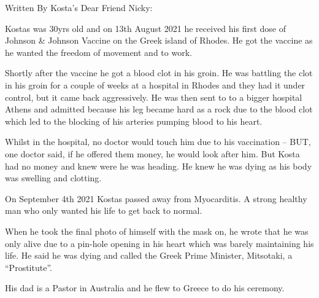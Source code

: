 Written By Kosta’s Dear Friend Nicky:

Kostas was 30yrs old and on 13th August 2021 he received his first dose of
Johnson \& Johnson Vaccine on the Greek island of Rhodes. He got the vaccine as
he wanted the freedom of movement and to work.

Shortly after the vaccine he got a blood clot in his groin. He was battling the
clot in his groin for a couple of weeks at a hospital in Rhodes and they had it
under control, but it came back aggressively. He was then sent to to a bigger
hospital Athens and admitted because his leg became hard as a rock due to the
blood clot which led to the blocking of his arteries pumping blood to his heart.

Whilst in the hospital, no doctor would touch him due to his vaccination – BUT,
one doctor said, if he offered them money, he would look after him. But Kosta
had no money and knew were he was heading. He knew he was dying as his body was
swelling and clotting.

On September 4th 2021 Kostas passed away from Myocarditis. A strong healthy man
who only wanted his life to get back to normal.

When he took the final photo of himself with the mask on, he wrote that he was
only alive due to a pin-hole opening in his heart which was barely maintaining
his life. He said he was dying and called the Greek Prime Minister, Mitsotaki, a
“Prostitute”.

His dad is a Pastor in Australia and he flew to Greece to do his ceremony.

